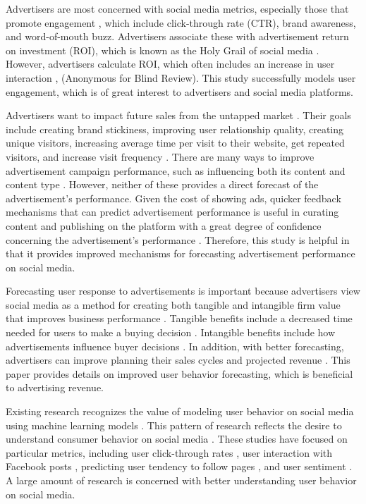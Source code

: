 \documentclass[mksc,blindrev]{informs3} %
\begin{document}
Advertisers are most concerned with social media metrics, especially those that promote engagement \cite{Tiago2014}, which include click-through rate (CTR), brand awareness, and word-of-mouth buzz. Advertisers associate these with advertisement return on investment (ROI), which is known as the Holy Grail of social media \cite{Fisher2009}. However, advertisers calculate ROI, which often includes an increase in user interaction \cite{Romero2011}, (Anonymous for Blind Review). This study successfully models user engagement, which is of great interest to advertisers and social media platforms.  

Advertisers want to impact future sales from the untapped market \cite{Guo2020}. Their goals include creating brand stickiness, improving user relationship quality, creating unique visitors, increasing average time per visit to their website, get repeated visitors, and increase visit frequency \cite{Bhat2002}. There are many ways to improve advertisement campaign performance, such as influencing both its content and content type \cite{Imsa2020}. However, neither of these provides a direct forecast of the advertisement's performance. Given the cost of showing ads, quicker feedback mechanisms that can predict advertisement performance is useful in curating content and publishing on the platform with a great degree of confidence concerning the advertisement's performance \cite{Hu2016}. Therefore, this study is helpful in that it provides improved mechanisms for forecasting advertisement performance on social media.

Forecasting user response to advertisements is important because advertisers view social media as a method for creating both tangible and intangible firm value that improves business performance \cite{Authors2013}. Tangible benefits include a decreased time needed for users to make a buying decision \cite{Authors2013}. Intangible benefits include how advertisements influence buyer decisions \cite{Authors2013}. In addition, with better forecasting, advertisers can improve planning their sales cycles and projected revenue \cite{Imsa2020}. This paper provides details on improved user behavior forecasting, which is beneficial to advertising revenue. 

Existing research recognizes the value of modeling user behavior on social media using machine learning models \cite{Li2015, 8029313, Ohsawa2013, Liu2012, Li2015}. This pattern of research reflects the desire to understand consumer behavior on social media \cite{Fisher2009}. These studies have focused on particular metrics, including user click-through rates \cite{Li2015}, user interaction with Facebook posts \cite{8029313}, predicting user tendency to follow pages \cite{Ohsawa2013}, and user sentiment \cite{Liu2012,Wang2015}. A large amount of research is concerned with better understanding user behavior on social media.
\end{document}
